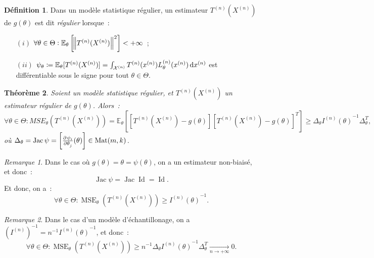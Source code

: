 \documentclass{report}
\DeclareMathOperator{\Mat}{Mat}
\DeclareMathOperator{\MSE}{MSE}
\DeclareMathOperator{\Jac}{Jac}
\DeclareMathOperator{\Id}{Id}
\newcommand{\E}{\mathbb E}
\newcommand{\pinfty}{{+\infty}}
\newcommand{\Xn}{{X^{(n)}}}
\newcommand{\Tn}{{T^{(n)}}}
\newcommand{\TnXn}{{\Tn(\Xn)}}
\newtheorem{thm}{Théorème}[chapter]
\theoremstyle{definition}
\newtheorem{déf}[thm]{Définition}
\theoremstyle{remark}
\newtheorem*{rmq}{Remarque}
\begin{document}
			\begin{déf} Dans un modèle statistique régulier, un estimateur $\TnXn$ de $g(\theta)$ est dit \textit{régulier} lorsque~:
			\begin{itemize}
				\item[$(i)$]  $\forall \theta \in \Theta : \E_\theta\left[\norm {\TnXn}^2\right] < \pinfty$~;
				\item[$(ii)$] $\psi_\theta \coloneqq \E_\theta[\TnXn] = \int_{\mathcal X^{(n)}}\Tn(x^{(n)})L_\theta^{(n)}(x^{(n)})\dif x^{(n)}$
				est différentiable sous le signe pour tout $\theta \in \Theta$.
			\end{itemize}
			\end{déf}

			\begin{thm}\label{thm:borneinfMSE} Soient un modèle statistique régulier, et $\TnXn$ un estimateur régulier de $g(\theta)$. Alors~:
			\[\forall \theta \in \Theta : MSE_\theta(\TnXn) = \E_\theta\left[\left[\TnXn - g(\theta)\right]\left[\TnXn - g(\theta)\right]^T\right]
				\geq \Delta_\theta{I^{(n)}(\theta)}^{-1}\Delta_\theta^T,\]
			où $\Delta_\theta = \Jac \psi = \left[\pd {\psi_i}{\theta_j}(\theta)\right] \in \Mat(m, k)$.
			\end{thm}

			\begin{rmq} Dans le cas où $g(\theta) = \theta = \psi(\theta)$, on a un estimateur non-biaisé, et donc~:
			\[\Jac \psi = \Jac \Id = \Id.\]
			Et donc, on a~:
			\[\forall \theta \in \Theta : \MSE_\theta(\TnXn) \geq {I^{(n)}(\theta)}^{-1}.\]
			\end{rmq}

			\begin{rmq} Dans le cas d'un modèle d'échantillonage, on a $(I^{(n)})^{-1} = n^{-1}{I^{(n)}(\theta)}^{-1}$, et donc~:
			\[\forall \theta \in \Theta : \MSE_\theta(\TnXn) \geq n^{-1}\Delta_\theta{I^{(n)}(\theta)}^{-1}\Delta_\theta^T \xrightarrow[n \to \pinfty]{} 0.\]
			\end{rmq}
\end{document}
